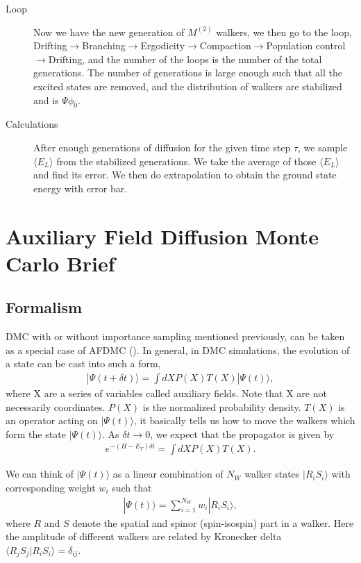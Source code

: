 \documentclass[12pt,letterpaper,UTF8]{report}
\begin{document}
{\begin{description}
  \item[Loop] Now we have the new generation of $M^{(2)}$ walkers, we then go to the loop, Drifting$\rightarrow$Branching$\rightarrow$Ergodicity$\rightarrow$Compaction$\rightarrow$Population control$\rightarrow$Drifting, and the number of the loops is the number of the total generations. The number of generations is large enough such that all the excited states are removed, and the distribution of walkers are stabilized and is $\Psi \phi_0$.
  \item[Calculations] After enough generations of diffusion for the given time step $\tau$, we sample $\langle E_L \rangle$ from the stabilized generations. We take the average of those $\langle E_L \rangle$ and find its error. We then do extrapolation to obtain the ground state energy with error bar.
\end{description}




\chapter{Auxiliary Field Diffusion Monte Carlo Brief}
\label{secAFDMC}
\clearpage
\section{Formalism}
DMC with or without importance sampling mentioned previously, can be taken as a special case of AFDMC (\cite{Schmidt99a,gandolfi2007auxiliary,CarlsonRMP15a}). In general, in DMC simulations, the evolution of a state can be cast into such a form,
\begin{eqnarray}
|\Psi(t+\delta t) \rangle = \int dX P(X) T(X) |\Psi(t) \rangle, \label{eq53}
\end{eqnarray}
where X are a series of variables called auxiliary fields. Note that X are not necessarily coordinates. $P(X)$ is the normalized probability density. $T(X)$ is an operator acting on $| \Psi(t) \rangle$, it basically tells us how to move the walkers which form the state $| \Psi(t) \rangle$. As $\delta t \rightarrow 0$, we expect that the propagator is given by
\begin{eqnarray}
e^{-(H-E_T) \delta t} = \int dX P(X) T(X).
\end{eqnarray}

We can think of $| \Psi(t) \rangle$ as a linear combination of $N_W$ walker states $| R_i S_i \rangle$ with corresponding weight $w_i$ such that
\begin{eqnarray}
| \Psi(t) \rangle = \sum_{i=1}^{N_W} w_i | R_i S_i \rangle,
\end{eqnarray}
where $R$ and $S$ denote the spatial and spinor (spin-isospin) part in a walker. Here the amplitude of different walkers are related by Kronecker delta $\langle R_j S_j | R_i S_i \rangle = \delta_{ij}$.

}
\end{document}
